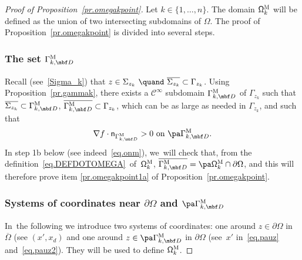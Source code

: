 \begin{proof}[Proof of Proposition~\ref{pr.omegakpoint}] Let $k\in \{1,\ldots,n\}$. The domain $\mathsf \Omega_k^{\textsc{M}}$ will be defined as the union of two intersecting subdomains of $\Omega$. The proof of Proposition~\ref{pr.omegakpoint} is divided into several steps.



\subsubsection*{The set $\Gamma_{k,\mbf D}^{\text{M}}$} Recall
(see~\eqref{Sigma_k}) that
$
z\in \Sigma_{z_k} \ \quand \ \overline{\Sigma_{z_k} }\subset \Gamma_{z_k}$.
Using Proposition~\ref{pr.gammak}, there exists a $\mathcal
C^\infty$ subdomain $\Gamma_{k,\mbf D}^{\text{M}}$ of $\Gamma_{z_k}$
such that $\overline{\Sigma_{z_k}}\subset \Gamma_{k,\mbf
D}^{\text{M}}$, $\overline{\Gamma_{k,\mbf D}^{\text{M}}}\subset
\Gamma_{z_k}$, which can be as large as needed in $\Gamma_{z_k}$, and
such that
\begin{equation}\label{eq.derivee_normale_positive}
\nabla f\cdot \mathsf n_{ \Gamma_{k,\mbf D}^{\text{M}} }>0 \text{ on } \pa \Gamma_{k,\mbf D}^{\text{M}}.
\end{equation}
In step 1b below (see indeed~\eqref{eq.onm}), we~will check that,
from the definition~\eqref{eq.DEFDOTOMEGA}~of~$\mathsf
\Omega_k^{\textsc{M}}$, $\overline{\Gamma_{k,\mbf D}^{\text{M}}}=
\pa \mathsf \Omega_k^{\textsc{M}}\cap \partial \Omega$, and this
will therefore prove item \eqref{pr.omegakpoint1a} of Proposition~\ref{pr.omegakpoint}.

\subsubsection*{Systems of coordinates near $\partial \Omega$ and $\pa \Gamma_{k,\mbf D}^{\text{M}}$}
In~the following we introduce two systems of coordinates: one around $z\in \partial \Omega$ in $\overline \Omega$ (see $(x',x_d)$ and one around $z\in \pa \Gamma_{k,\mbf D}^{\text{M}}$ in $\partial \Omega$ (see~$x'$ in~\eqref{eq.pauz} and~\eqref{eq.pauz2}). They will be used to define $\mathsf \Omega_k^{\textsc{M}}$.


\end{proof}
